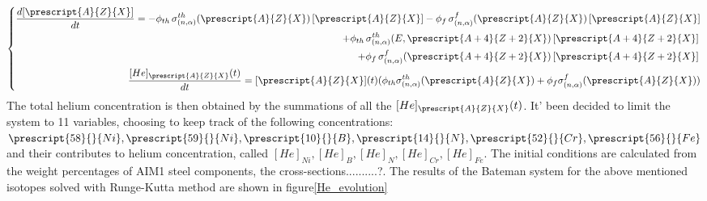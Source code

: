 \begin{equation}
\left\{
\begin{aligned}
 \frac{d[\prescript{A}{Z}{X}]}{dt} = - \phi_{th}\,\sigma_{(n,\alpha)}^{th}(\prescript{A}{Z}{X})\,[\prescript{A}{Z}{X}]  - \phi_{f}\,\sigma_{(n,\alpha)}^{f}(\prescript{A}{Z}{X})\,[\prescript{A}{Z}{X}] \\
+ \phi_{th}\,\sigma_{(n,\alpha)}^{th}(E,\prescript{A+4}{Z+2}{X})\,[\prescript{A+4}{Z+2}{X}]\,\\
 + \phi_{f}\,\sigma_{(n,\alpha)}^{f}(\prescript{A+4}{Z+2}{X})\,[\prescript{A+4}{Z+2}{X}]\,
\\ 
 \frac{[He]_{\prescript{A}{Z}{X}}(t)}{dt} = [\prescript{A}{Z}{X}](t) ( \phi_{th} \sigma_{(n,\alpha)}^{th}(\prescript{A}{Z}{X}) + \phi_{f}\sigma_{(n,\alpha)}^{f}(\prescript{A}{Z}{X}))
\end{aligned}
\right.
\end{equation}
\bigskip
The total helium concentration is then obtained by the summations of all the \([He]_{\prescript{A}{Z}{X}}(t)\). It' been decided to limit the system to 11 variables, choosing to keep track of the following concentrations: \(\prescript{58}{}{Ni}, \prescript{59}{}{Ni},\prescript{10}{}{B},\prescript{14}{}{N},\prescript{52}{}{Cr},\prescript{56}{}{Fe}\) and their contributes to helium concentration, called \([He]_{Ni}, [He]_B, [He]_N, [He]_{Cr}, [He]_{Fe}\). The initial conditions are calculated from the weight percentages of AIM1 steel components, the cross-sections..........?.
The results of the Bateman system for the above mentioned isotopes solved with Runge-Kutta method are shown in figure\ref{He_evolution} 

